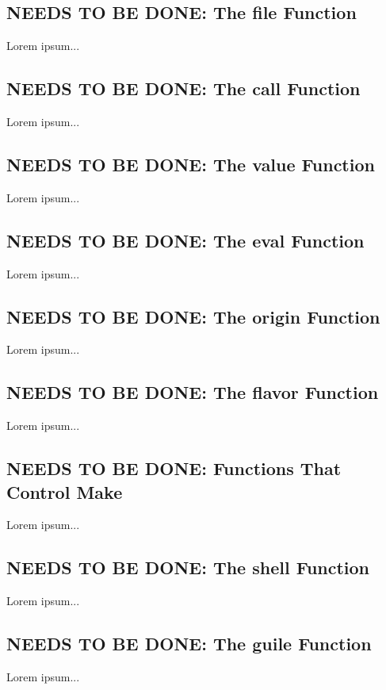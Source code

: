 \documentclass{charun}
\begin{document}
\begin{multicols*}{2}
\color{gray}
\subsection{NEEDS TO BE DONE: The file Function}
Lorem ipsum...
\color{black}

\color{gray}
\subsection{NEEDS TO BE DONE: The call Function}
Lorem ipsum...
\color{black}

\color{gray}
\subsection{NEEDS TO BE DONE: The value Function}
Lorem ipsum...
\color{black}

\color{gray}
\subsection{NEEDS TO BE DONE: The eval Function}
Lorem ipsum...
\color{black}

\color{gray}
\subsection{NEEDS TO BE DONE: The origin Function}
Lorem ipsum...
\color{black}

\color{gray}
\subsection{NEEDS TO BE DONE: The flavor Function}
Lorem ipsum...
\color{black}

\color{gray}
\subsection{NEEDS TO BE DONE: Functions That Control Make}
Lorem ipsum...
\color{black}

\color{gray}
\subsection{NEEDS TO BE DONE: The shell Function}
Lorem ipsum...
\color{black}

\color{gray}
\subsection{NEEDS TO BE DONE: The guile Function}
Lorem ipsum...
\color{black}



\end{multicols*}
\end{document}
